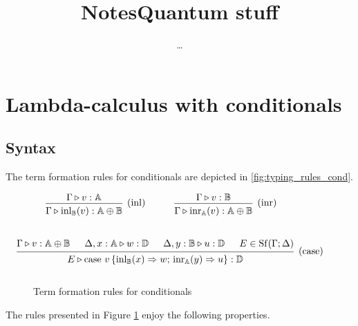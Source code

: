 \documentclass[10pt,a4paper]{amsart}
\author{\dots}
\title{Notes}
\theoremstyle{definition}
\theoremstyle{definition}
\theoremstyle{definition}
\theoremstyle{definition}
\theoremstyle{definition}
\theoremstyle{definition}
\begin{document}
\title{Quantum stuff}
\maketitle
\section{Lambda-calculus with conditionals}

\subsection{Syntax}

The term formation rules for conditionals are depicted in \autoref{fig:typing_rules_cond}. 


\begin{figure}[H]
    \begin{equation*}
    \begin{aligned}
    &\hspace{10pt}
    \begin{prooftree}
        \hypo{\Gamma \vljud v: \typeA}
        \infer1[(inl)]{\Gamma \vljud \inl_{\typeB}(v): \typeA \oplus \typeB}
    \end{prooftree}
    \hspace{30pt}
    \begin{prooftree}
        \hypo{\Gamma \vljud v: \typeB}
        \infer1[(inr)]{\Gamma \vljud \inr_{\typeA}(v): \typeA \oplus \typeB}
    \end{prooftree} 
    \\[20pt]
    &\hspace{-20pt}
    \begin{prooftree}
        \hypo{\Gamma \vljud v: \typeA \oplus \typeB}
        \hypo{\Delta, x: \typeA \vljud w: \typeD}
        \hypo{\Delta, y: \typeB \vljud u: \typeD}
        \hypo{E \in \Shuff(\Gamma; \Delta)}
        \infer4[(case)]{E \vljud \text{case } v\,
        \{\inl_{\typeB}(x) 
            \Rightarrow w ; \,
          \inr_{\typeA}(y) \Rightarrow u
        \}: \typeD}
    \end{prooftree}
    \\[10pt]
    \end{aligned}
    \end{equation*}
    \caption{Term formation rules for conditionals}
    \label{fig:typing_rules_cond}
\end{figure}
The rules presented in Figure \ref{fig:typing_rules_cond} enjoy the following
properties.
\end{document}

